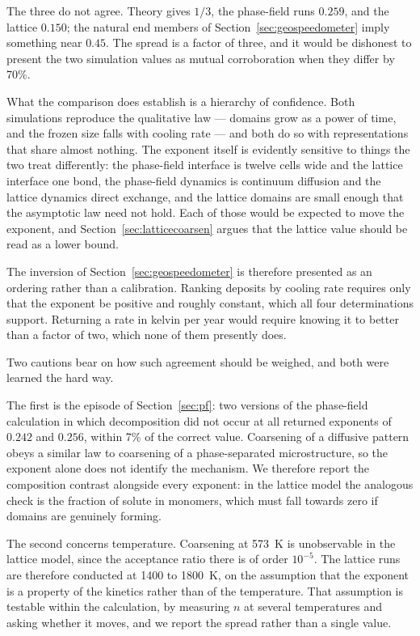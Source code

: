 \documentclass[11pt,a4paper]{article}
\begin{document}
The three do not agree. Theory gives $1/3$, the phase-field runs $0.259$, and
the lattice $0.150$; the natural end members of Section~\ref{sec:geospeedometer}
imply something near $0.45$. The spread is a factor of three, and it would be
dishonest to present the two simulation values as mutual corroboration when they
differ by 70\%.

What the comparison does establish is a hierarchy of confidence. Both
simulations reproduce the qualitative law --- domains grow as a power of time,
and the frozen size falls with cooling rate --- and both do so with
representations that share almost nothing. The exponent itself is evidently
sensitive to things the two treat differently: the phase-field interface is
twelve cells wide and the lattice interface one bond, the phase-field dynamics
is continuum diffusion and the lattice dynamics direct exchange, and the lattice
domains are small enough that the asymptotic law need not hold. Each of those
would be expected to move the exponent, and Section~\ref{sec:latticecoarsen}
argues that the lattice value should be read as a lower bound.

The inversion of Section~\ref{sec:geospeedometer} is therefore presented as an
ordering rather than a calibration. Ranking deposits by cooling rate requires
only that the exponent be positive and roughly constant, which all four
determinations support. Returning a rate in kelvin per year would require
knowing it to better than a factor of two, which none of them presently does.

Two cautions bear on how such agreement should be weighed, and both were learned
the hard way.

The first is the episode of Section~\ref{sec:pf}: two versions of the
phase-field calculation in which decomposition did not occur at all returned
exponents of $0.242$ and $0.256$, within 7\% of the correct value. Coarsening of
a diffusive pattern obeys a similar law to coarsening of a phase-separated
microstructure, so the exponent alone does not identify the mechanism. We
therefore report the composition contrast alongside every exponent: in the
lattice model the analogous check is the fraction of solute in monomers, which
must fall towards zero if domains are genuinely forming.

The second concerns temperature. Coarsening at 573~K is unobservable in the
lattice model, since the acceptance ratio there is of order $10^{-5}$. The
lattice runs are therefore conducted at 1400 to 1800~K, on the assumption that
the exponent is a property of the kinetics rather than of the temperature. That
assumption is testable within the calculation, by measuring $n$ at several
temperatures and asking whether it moves, and we report the spread rather than a
single value.
\end{document}
